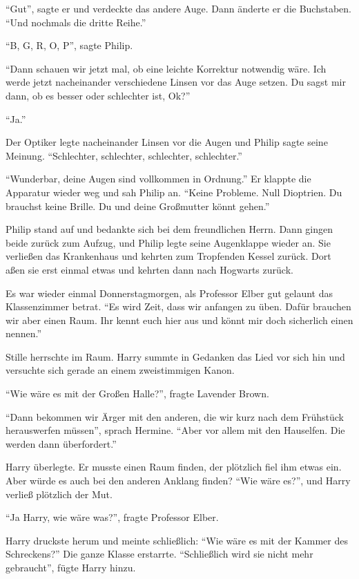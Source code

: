 \enquote{Gut}, sagte er und verdeckte das andere Auge. Dann änderte er die Buchstaben. \enquote{Und nochmals die dritte Reihe.}

\enquote{B, G, R, O, P}, sagte Philip.

\enquote{Dann schauen wir jetzt mal, ob eine leichte Korrektur notwendig wäre. Ich werde jetzt nacheinander verschiedene Linsen vor das Auge setzen. Du sagst mir dann, ob es besser oder schlechter ist, Ok?}

\enquote{Ja.}

Der Optiker legte nacheinander Linsen vor die Augen und Philip sagte seine Meinung. \enquote{Schlechter, schlechter, schlechter, schlechter.}

\enquote{Wunderbar, deine Augen sind vollkommen in Ordnung.} Er klappte die Apparatur wieder weg und sah Philip an. \enquote{Keine Probleme. Null Dioptrien. Du brauchst keine Brille. Du und deine Großmutter könnt gehen.}

Philip stand auf und bedankte sich bei dem freundlichen Herrn. Dann gingen beide zurück zum Aufzug, und Philip legte seine Augenklappe wieder an. Sie verließen das Krankenhaus und kehrten zum Tropfenden Kessel zurück. Dort aßen sie erst einmal etwas und kehrten dann nach Hogwarts zurück.

\trenn

Es war wieder einmal Donnerstagmorgen, als Professor Elber gut gelaunt das Klassenzimmer betrat. \enquote{Es wird Zeit, dass wir anfangen zu üben. Dafür brauchen wir aber einen Raum. Ihr kennt euch hier aus und könnt mir doch sicherlich einen nennen.}

Stille herrschte im Raum. Harry summte in Gedanken das Lied vor sich hin und versuchte sich gerade an einem zweistimmigen Kanon.

\enquote{Wie wäre es mit der Großen Halle?}, fragte Lavender Brown.

\enquote{Dann bekommen wir Ärger mit den anderen, die wir kurz nach dem Frühstück herauswerfen müssen}, sprach Hermine. \enquote{Aber vor allem mit den Hauselfen. Die werden dann überfordert.}

Harry überlegte. Er musste einen Raum finden, der \gst plötzlich fiel ihm etwas ein. Aber würde es auch bei den anderen Anklang finden? \enquote{Wie wäre es?}, und Harry verließ plötzlich der Mut.

\enquote{Ja Harry, wie wäre was?}, fragte Professor Elber.

Harry druckste herum und meinte schließlich: \enquote{Wie wäre es mit der Kammer des Schreckens?} Die ganze Klasse erstarrte. \enquote{Schließlich wird sie nicht mehr gebraucht}, fügte Harry hinzu.

